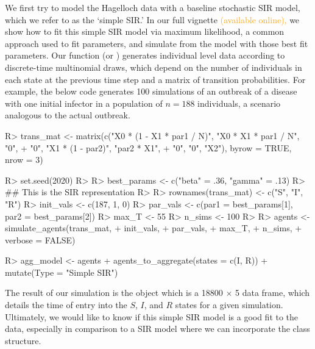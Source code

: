 \documentclass[
  shortnames]{jss}
\begin{document}
We first try to model the Hagelloch data with a baseline stochastic SIR
model, which we refer to as the `simple SIR.' In our full vignette
\textcolor{orange}{(available online),} we show how to fit this simple
SIR model via maximum likelihood, a common approach used to fit
parameters, and simulate from the model with those best fit parameters.
Our function  (or )
generates individual level data according to discrete-time multinomial
draws, which depend on the number of individuals in each state at the
previous time step and a matrix of transition probabilities. For
example, the below code generates 100 simulations of an outbreak of a
disease with one initial infector in a population of \(n= 188\)
individuals, a scenario analogous to the actual outbreak.

\begin{CodeChunk}
\begin{CodeInput}
R> trans_mat <- matrix(c("X0 * (1 - X1 * par1 / N)", "X0 * X1  * par1 / N", "0",
+                   "0", "X1 * (1 - par2)", "par2 * X1",
+                   "0", "0", "X2"), byrow = TRUE, nrow = 3)
\end{CodeInput}
\end{CodeChunk}

\begin{CodeChunk}
\begin{CodeInput}
R> set.seed(2020)
R> 
R> best_params <- c("beta" = .36, "gamma" = .13)
R> ## This is the SIR representation
R> 
R> rownames(trans_mat) <- c("S", "I", "R")
R> init_vals <- c(187, 1, 0)
R> par_vals <- c(par1 = best_params[1], par2 = best_params[2])
R> max_T <- 55
R> n_sims <- 100
R> 
R> agents <- simulate_agents(trans_mat,
+                        init_vals,
+                        par_vals,
+                        max_T,
+                        n_sims,
+                        verbose = FALSE)
\end{CodeInput}
\end{CodeChunk}

\begin{CodeChunk}
\begin{CodeInput}
R> agg_model <- agents %
+   agents_to_aggregate(states = c(I, R)) %
+   mutate(Type = "Simple SIR")
\end{CodeInput}
\end{CodeChunk}

The result of our simulation is the object  which is a
18800 \(\times\) 5 data frame, which details the time of entry into the
\(S\), \(I\), and \(R\) states for a given simulation. Ultimately, we
would like to know if this simple SIR model is a good fit to the data,
especially in comparison to a SIR model where we can incorporate the
class structure.
\end{document}
